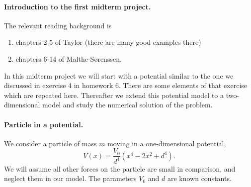 \documentclass[%
oneside,                 %
final,                   %
10pt]{article}
\begin{document}
\noindent
\paragraph{Introduction to the first midterm project.}
The relevant reading background is
\begin{enumerate}
\item chapters 2-5 of Taylor (there are many good examples there)

\item chapters 6-14 of Malthe-Sørenssen.
\end{enumerate}

\noindent
In this midterm project we will start with a  potential similar to the one we discussed in exercise 4
in homework 6. There are some elements of that exercise which are repeated here. Thereafter we extend this potential model to a two-dimensional model and study the numerical solution of the problem. 

\paragraph{Particle in a  potential.}
We consider a particle of mass $m$ moving in a one-dimensional potential,
\[
V(x)=\frac{V_0}{d^4}\left(x^4-2x^2+d^4\right).
\]
We will assume all other forces on the particle are small in comparison, and neglect them in our model.  The parameters $V_0$ and $d$ are known constants. 
\end{document}
